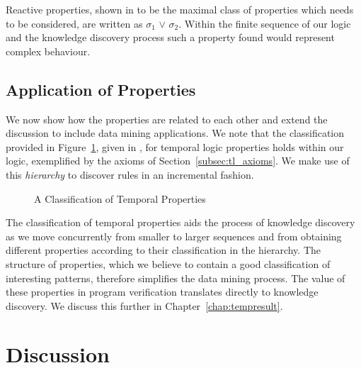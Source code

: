 \medskip

Reactive properties, shown in \cite{mp92} to be the maximal
class of properties which needs to be considered, are written as
 $\sigma_1$ $\vee$  $\sigma_2$. Within the
finite sequence of our logic and the knowledge discovery process such
a property found would represent complex behaviour.


\subsection{Application of Properties}

We now show how the properties are related to each other and extend
the discussion to include data mining applications. We note that
the classification provided in Figure~\ref{fig:Classification}, given
in \cite{mp92}, for temporal logic properties holds within our logic,
exemplified by the axioms of Section~\ref{subsec:tl_axioms}. We make
use of this {\em hierarchy} to discover rules in an incremental fashion.

\begin{figure}[ht]
\centerline{}
\caption{\label{fig:Classification} A Classification of Temporal
Properties}
\end{figure}
The classification of temporal properties aids the process of
knowledge discovery as we move concurrently from smaller to larger
sequences and from obtaining different properties according to their
classification in the hierarchy. The structure of properties, which we
believe to contain a good classification of interesting patterns,
therefore simplifies the data 
mining process. The value of these properties in program verification
translates directly to knowledge discovery. We discuss this further in
Chapter~\ref{chap:tempresult}.  

\section{Discussion}\label{sec:tl_disc}


